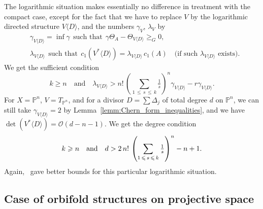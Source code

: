 \documentclass[AHL,Unicode,longabstracts,published]{cedram}
\newcommand*\cO{\mathcal{O}}
\newcommand*\bP{\mathbb{P}}
\let\leq\leqslant
\let\geq\geqslant
\begin{document}
The logarithmic situation makes essentially no difference in treatment with the compact case, except for the fact that we have to replace $V$ by the logarithmic directed structure $V\langle D\rangle$, and the numbers
$\gamma_V$, $\lambda_V$ by
\begin{align*}
&\gamma_{V\langle D\rangle}=\inf\gamma~~\text{such that}~~
\gamma\Theta_A-\Theta_{V\langle D\rangle}\geq_G 0,
\\
&\lambda_{V\langle D\rangle}~~\text{such that}~~c_1(V^*\langle D\rangle)=\lambda_{V\langle D\rangle}\,c_1(A)\quad
\text{(if such $\lambda_{V\langle D\rangle}$ exists)}.
\end{align*}
We get the sufficient condition
\[
k\geq n\quad\text{and}\quad
\lambda_{V\langle D\rangle}>n!\,\left(\sum_{1\,\leq\,s\,\leq\,k}\tfrac{1}{ s}
\right)^n\gamma_{V\langle D\rangle}-r\gamma_{V\langle D\rangle}.
\]
For $X=\bP^n$, $V=T_{\bP^n}$, and for a divisor $D=\sum\Delta_j$ of total degree $d$ on $\bP^n$, we can still take $\gamma_{V\langle D\rangle}=2$ by {Lemma}~\ref{lemm:Chern_form_inequalities}, and we have $\det(V^*\langle D\rangle)=\cO(d-n-1)$. We get the degree condition
\[
k
\geq n
\text{\quad and\quad} d > 2\,n!\,\left(\sum_{1\,\leq\,s\,\leq\,k}\tfrac{1}{s}\right)^n-n+1.
\]
Again,~\cite{Dar16,MTa19} gave better bounds for this particular logarithmic situation.

\subsection{Case of orbifold structures on projective space}
\end{document}
